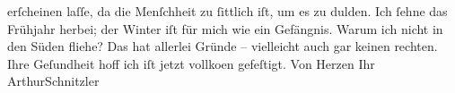 \begin{ledgroupsized}[t]{13cm}
                    erſcheinen laſſe, da die Menſchheit zu ſittlich iſt, um es zu dulden.\pend
           \pstart
           Ich ſehne das Frühjahr herbei; der Winter iſt für mich wie ein Gefängnis. Warum
                    ich nicht in den Süden fliehe? Das hat allerlei Gründe – vielleicht auch gar
                    keinen rechten. Ihre Geſundheit hoff ich iſt jetzt vollko{\geminationm}en gefeſtigt. Von Herzen Ihr
                        \spacefill\mbox{ArthurSchnitzler}\pend
           \endnumbering{}\end{ledgroupsized}  \newcommand{\dateiname}{L01012}\newcommand{\titel}{Arthur Schnitzler an Georg Brandes, 11. 2. 1900}\newcommand{\editorInnen}{Martin Anton Müller und Gerd-Hermann Susen}
      